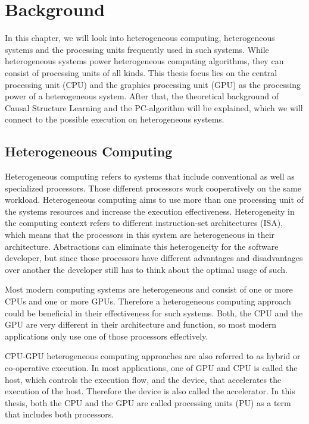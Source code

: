 \chapter{Background}
In this chapter, we will look into heterogeneous computing, heterogeneous systems and the processing units frequently used in such systems. While heterogeneous systems power heterogeneous computing algorithms, they can consist of processing units of all kinds. This thesis focus lies on the central processing unit (CPU) and the graphics processing unit (GPU) as the processing power of a heterogeneous system.
After that, the theoretical background of Causal Structure Learning and the PC-algorithm will be explained, which we will connect to the possible execution on heterogeneous systems.

\section{Heterogeneous Computing}
Heterogeneous computing refers to systems that include conventional as well as specialized processors. Those different processors work cooperatively on the same workload. \cite{shan_heterogeneous_2006} Heterogeneous computing aims to use more than one processing unit of the systems resources and increase the execution effectiveness. Heterogeneity in the computing context refers to different instruction-set architectures (ISA), which means that the processors in this system are heterogeneous in their architecture.
Abstractions can eliminate this heterogeneity for the software developer, but since those processors have different advantages and disadvantages over another the developer still has to think about the optimal usage of such.

Most modern computing systems are heterogeneous and consist of one or more CPUs and one or more GPUs. Therefore a heterogeneous computing approach could be beneficial in their effectiveness for such systems. Both, the CPU and the GPU are very different in their architecture and function, so most modern applications only use one of those processors effectively.

CPU-GPU heterogeneous computing approaches are also referred to as hybrid or co-operative execution. In most applications, one of GPU and CPU is called the host, which controls the execution flow, and the device, that accelerates the execution of the host. Therefore the device is also called the accelerator. In this thesis, both the CPU and the GPU are called processing units (PU) as a term that includes both processors.


